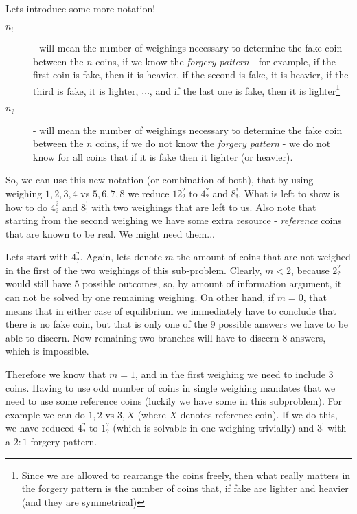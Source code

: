 \begin{problem}
Lets introduce some more notation!
\begin{description}
\item[$n_!$] - will mean the number of weighings necessary to determine the fake coin between the $n$ coins, if we know the \textit{forgery pattern} - for example, if the first coin is fake, then it is heavier, if the second is fake, it is heavier, if the third is fake, it is lighter, $\dots$,  and if the last one is fake, then it is lighter\footnote{Since we are allowed to rearrange the coins freely, then what really matters in the forgery pattern is the number of coins that, if fake are lighter and heavier (and they are symmetrical)} 
\item[$n_?$] - will mean the number of weighings necessary to determine the fake coin between the $n$ coins, if we do not know the \textit{forgery pattern} - we do not know for all coins that if it is fake then it lighter (or heavier). 
\end{description}

So, we can use this new notation (or combination of both), that by using weighing $1,2,3,4$ vs $5,6,7,8$ we reduce $12^?_?$ to $4^?_?$ and $8^!_!$. What is left to show is how to do $4^?_?$ and $8^!_!$ with two weighings that are left to us. Also note that starting from the second weighing we have some extra resource - \textit{reference} coins that are known to be real. We might need them...

Lets start with $4^?_?$. Again, lets denote $m$ the amount of coins that are not weighed in the first of the two weighings of this sub-problem. Clearly, $m<2$, because $2^?_?$ would still have $5$ possible outcomes, so, by amount of information argument, it can not be solved by one remaining weighing.  On other hand, if $m=0$, that means that in either case of equilibrium we immediately have to conclude that there is no fake coin, but that is only one of the $9$ possible answers we have to be able to discern. Now remaining two branches will have to discern $8$ answers, which is impossible. 

Therefore we know that $m=1$, and in the first weighing we need to include $3$ coins.  Having to use odd number of coins in single weighing mandates that we need to use some reference coins (luckily we have some in this subproblem). For example we can do $1,2$ vs $3,X$ (where $X$ denotes reference coin). If we do this, we have reduced $4^?_?$ to $1^?_?$ (which is solvable in one weighing trivially) and $3^!_!$ with a $2:1$ forgery pattern.


\end{problem}
